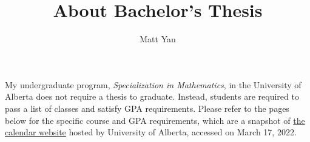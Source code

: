 \documentclass[11pt]{article}
\title{About Bachelor's Thesis}
\author{Matt Yan}
\begin{document}
    \maketitle

    My undergraduate program, \textit{Specialization in Mathematics}, in the University of Alberta does not require a
    thesis to graduate.
    Instead, students are required to pass a list of classes and satisfy GPA requirements.
    Please refer to the pages below for the specific course and GPA requirements,
    which are a snapshot of \href{https://calendar.ualberta.ca/preview_program.php?catoid=36&poid=42306&returnto=11345}{the calendar website} hosted by University of Alberta, accessed on March 17, 2022.

    
\end{document}
